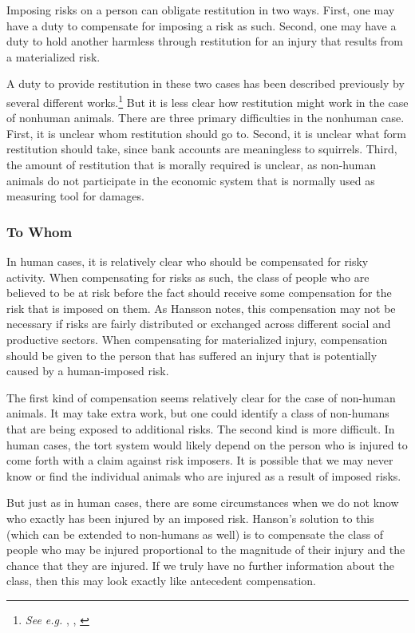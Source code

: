 Imposing risks on a person can obligate restitution in two ways. First, one may
have a duty to compensate for imposing a risk as such. Second, one may have a
duty to hold another harmless through restitution for an injury that results
from a materialized risk.

A duty to provide restitution in these two cases has been described previously
by several different works.\footnote{\emph{See e.g.} \cite{hansson_risk},
\cite{frowe}, \cite{finkelstein}} But it is less clear how restitution might
work in the case of nonhuman animals. There are three primary difficulties in the
nonhuman case.  First, it is unclear whom restitution should go to. Second, it
is unclear what form restitution should take, since bank accounts are
meaningless to squirrels. Third, the amount of restitution that is morally
required is unclear, as non-human animals do not participate in the economic
system that is normally used as measuring tool for damages.

\subsubsection{To Whom}

In human cases, it is relatively clear who should be compensated for risky
activity. When compensating for risks as such, the class of people who are
believed to be at risk before the fact should receive some compensation for the
risk that is imposed on them. As Hansson notes, this compensation may not be
necessary if risks are fairly distributed or exchanged across different social
and productive sectors.\autocite[103]{hansson_risk} When compensating for
materialized injury, compensation should be given to the person that has
suffered an injury that is potentially caused by a human-imposed
risk.\autocite[112--113]{hansson_risk}


The first kind of compensation seems relatively clear for the case of non-human
animals. It may take extra work, but one could identify a class of non-humans
that are being exposed to additional risks. The second kind is more difficult.
In human cases, the tort system would likely depend on the person who is
injured to come forth with a claim against risk imposers. It is possible that
we may never know or find the individual animals who are injured as a result of
imposed risks.

But just as in human cases, there are some circumstances when we do not know
who exactly has been injured by an imposed risk. Hanson’s solution to this
(which can be extended to non-humans as well) is to compensate the class of
people who may be injured proportional to the magnitude of their injury and the
chance that they are injured. If we truly have no further information about the
class, then this may look exactly like antecedent compensation.

